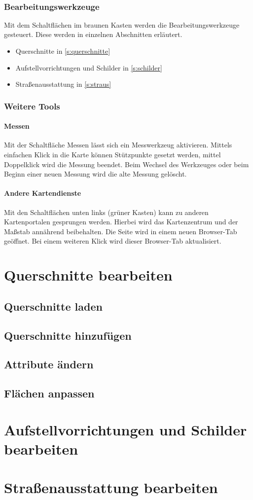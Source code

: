 \documentclass[a4paper,11pt,bibliography=totoc, listof=totoc,titlepage]{scrartcl}
\begin{document}
\

\subsubsection{Bearbeitungswerkzeuge}
Mit dem Schaltflächen im braunen Kasten werden die Bearbeitungswerkzeuge gesteuert. Diese werden in einzelnen Abschnitten erläutert.

\begin{itemize}
    \item Querschnitte in \autoref{s:querschnitte}
    \item Aufstellvorrichtungen und Schilder in \autoref{s:schilder}
    \item Straßenausstattung in \autoref{s:straus}
\end{itemize}

\subsubsection{Weitere Tools}
\paragraph{Messen}
Mit der Schaltfläche Messen lässt sich ein Messwerkzeug aktivieren. Mittels einfachen Klick in die Karte können Stützpunkte gesetzt werden, mittel Doppelklick wird die Messung beendet. Beim Wechsel des Werkzeuges oder beim Beginn einer neuen Messung wird die alte Messung gelöscht.

\paragraph{Andere Kartendienste}
Mit den Schaltflächen unten links (grüner Kasten) kann zu anderen Kartenportalen gesprungen werden. Hierbei wird das Kartenzentrum und der Maßstab annährend beibehalten. Die Seite wird in einem neuen Browser-Tab geöffnet. Bei einem weiteren Klick wird dieser Browser-Tab aktualisiert.

\section{Querschnitte bearbeiten}
\label{s:querschnitte}

\subsection{Querschnitte laden}
\subsection{Querschnitte hinzufügen}
\subsection{Attribute ändern}
\subsection{Flächen anpassen}

\section{Aufstellvorrichtungen und Schilder bearbeiten}
\label{s:schilder}

\section{Straßenausstattung bearbeiten}
\label{s:straus}
\end{document}
